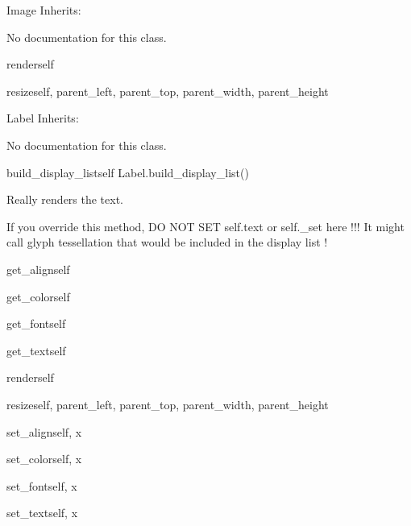 \begin{classdesc*}{Image}
Inherits:

No documentation for this class.

\begin{methoddesc}{render}{self}
\end{methoddesc}

\begin{methoddesc}{resize}{self, parent_left, parent_top, parent_width, parent_height}
\end{methoddesc}

\end{classdesc*}

\begin{classdesc*}{Label}
Inherits:

No documentation for this class.

\begin{methoddesc}{build_display_list}{self}
Label.build\_display\_list()

Really renders the text.

If you override this method, DO NOT SET self.text or self.\_set here !!!
It might call glyph tessellation that would be included in the display list !
\end{methoddesc}

\begin{methoddesc}{get_align}{self}
\end{methoddesc}

\begin{methoddesc}{get_color}{self}
\end{methoddesc}

\begin{methoddesc}{get_font}{self}
\end{methoddesc}

\begin{methoddesc}{get_text}{self}
\end{methoddesc}

\begin{methoddesc}{render}{self}
\end{methoddesc}

\begin{methoddesc}{resize}{self, parent_left, parent_top, parent_width, parent_height}
\end{methoddesc}

\begin{methoddesc}{set_align}{self, x}
\end{methoddesc}

\begin{methoddesc}{set_color}{self, x}
\end{methoddesc}

\begin{methoddesc}{set_font}{self, x}
\end{methoddesc}

\begin{methoddesc}{set_text}{self, x}
\end{methoddesc}

\end{classdesc*}

